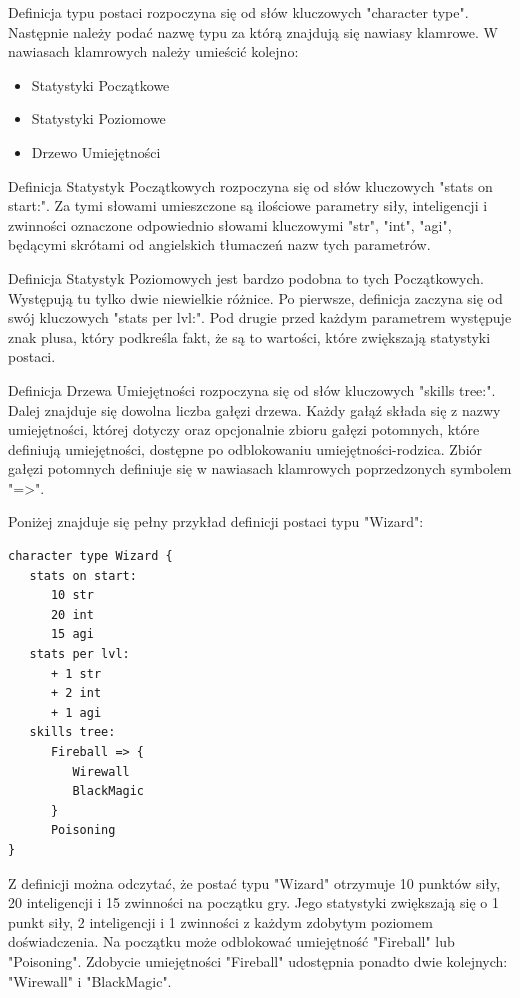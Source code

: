 \documentclass{xmgr}
\begin{document}
Definicja typu postaci rozpoczyna się od słów kluczowych "character type". Następnie należy podać nazwę typu za którą znajdują się nawiasy klamrowe. W nawiasach klamrowych należy umieścić kolejno:
\begin{itemize}
	\item Statystyki Początkowe
	\item Statystyki Poziomowe
	\item Drzewo Umiejętności
\end{itemize}

Definicja Statystyk Początkowych rozpoczyna się od słów kluczowych "stats on start:". Za tymi słowami umieszczone są ilościowe parametry siły, inteligencji i zwinności oznaczone odpowiednio słowami kluczowymi "str", "int", "agi", będącymi skrótami od angielskich tłumaczeń nazw tych parametrów.

Definicja Statystyk Poziomowych jest bardzo podobna to tych Początkowych. Występują tu tylko dwie niewielkie różnice. Po pierwsze, definicja zaczyna się od swój kluczowych "stats per lvl:". Pod drugie przed każdym parametrem występuje znak plusa, który podkreśla fakt, że są to wartości, które zwiększają statystyki postaci. 

Definicja Drzewa Umiejętności rozpoczyna się od słów kluczowych "skills tree:". Dalej znajduje się dowolna liczba gałęzi drzewa.
Każdy gałąź składa się z nazwy umiejętności, której dotyczy oraz opcjonalnie zbioru gałęzi potomnych, które definiują umiejętności, dostępne po odblokowaniu umiejętności-rodzica.
Zbiór gałęzi potomnych definiuje się w nawiasach klamrowych poprzedzonych symbolem "=>". 

Poniżej znajduje się pełny przykład definicji postaci typu "Wizard":
\begin{lstlisting}
character type Wizard {
   stats on start:
      10 str
      20 int
      15 agi
   stats per lvl:
      + 1 str
      + 2 int
      + 1 agi
   skills tree:
      Fireball => {
         Wirewall
         BlackMagic
      }
      Poisoning
}
\end{lstlisting}
Z definicji można odczytać, że postać typu "Wizard" otrzymuje 10 punktów siły, 20 inteligencji i 15 zwinności na początku gry.
Jego statystyki zwiększają się o 1 punkt siły, 2 inteligencji i 1 zwinności z każdym zdobytym poziomem doświadczenia.
Na początku może odblokować umiejętność "Fireball" lub "Poisoning". Zdobycie umiejętności "Fireball" udostępnia ponadto dwie kolejnych: "Wirewall" i "BlackMagic". 
\end{document}
